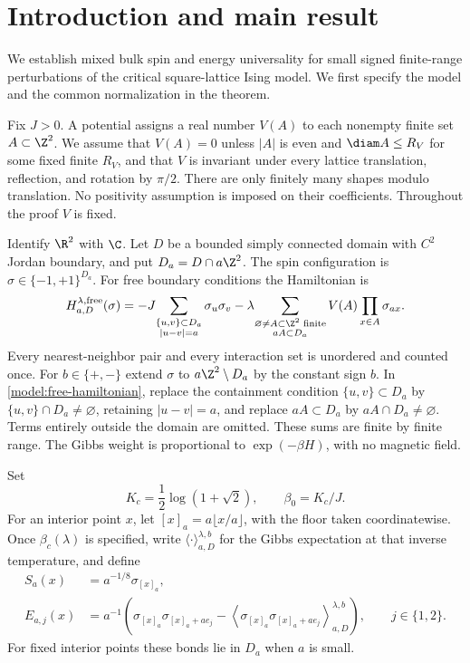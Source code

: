 \section{Introduction and main result}\label{sec:model}

We establish mixed bulk spin and energy universality for small signed
finite-range perturbations of the critical square-lattice Ising model.
We first specify the model and the common normalization in the theorem.


Fix $J>0$. A potential assigns a real number $V(A)$ to each nonempty
finite set $A\subset\Z^2$. We assume that $V(A)=0$ unless $|A|$ is even
and $\diam A\le R_V$ for some fixed finite $R_V$, and that $V$ is
invariant under every lattice translation, reflection, and rotation by
$\pi/2$. There are only finitely many shapes modulo translation. No
positivity assumption is imposed on their coefficients. Throughout the
proof $V$ is fixed.

Identify $\R^2$ with $\C$. Let $D$ be a bounded simply connected domain
with $C^2$ Jordan boundary, and put $D_a=D\cap a\Z^2$. The spin
configuration is $\sigma\in\{-1,+1\}^{D_a}$. For free boundary
conditions the Hamiltonian is
\begin{equation}\label{model:free-hamiltonian}
 H_{a,D}^{\lambda,\mathrm{free}}(\sigma)
 =-J\!\sum_{\substack{\{u,v\}\subset D_a\\|u-v|=a}}
       \sigma_u\sigma_v
  -\lambda\!\sum_{\substack{\varnothing\ne A\subset\Z^2\text{ finite}\\aA\subset D_a}}
       V(A)\prod_{x\in A}\sigma_{ax}.
\end{equation}
Every nearest-neighbor pair and every interaction set is unordered and
counted once. For $b\in\{+,-\}$ extend $\sigma$ to $a\Z^2\setminus D_a$
by the constant sign $b$. In \eqref{model:free-hamiltonian}, replace the
containment condition $\{u,v\}\subset D_a$ by
$\{u,v\}\cap D_a\ne\varnothing$, retaining $|u-v|=a$, and replace
$aA\subset D_a$ by $aA\cap D_a\ne\varnothing$. Terms entirely outside the
domain are omitted. These sums are finite by finite range. The Gibbs
weight is proportional to $\exp(-\beta H)$, with no magnetic field.

Set
\[
 K_c=\frac12\log(1+\sqrt2),\qquad \beta_0=K_c/J.
\]
For an interior point $x$, let $[x]_a=a\lfloor x/a\rfloor$, with the
floor taken coordinatewise. Once $\beta_c(\lambda)$ is specified, write
$\langle\cdot\rangle_{a,D}^{\lambda,b}$ for the Gibbs expectation at
that inverse temperature, and define
\begin{align}
 S_a(x)&=a^{-1/8}\sigma_{[x]_a},\label{model:spin}\\
 E_{a,j}(x)&=a^{-1}\left(\sigma_{[x]_a}\sigma_{[x]_a+ae_j}
       -\left\langle\sigma_{[x]_a}\sigma_{[x]_a+ae_j}
          \right\rangle_{a,D}^{\lambda,b}\right),
       \qquad j\in\{1,2\}.\label{model:energy}
\end{align}
For fixed interior points these bonds lie in $D_a$ when $a$ is small.

